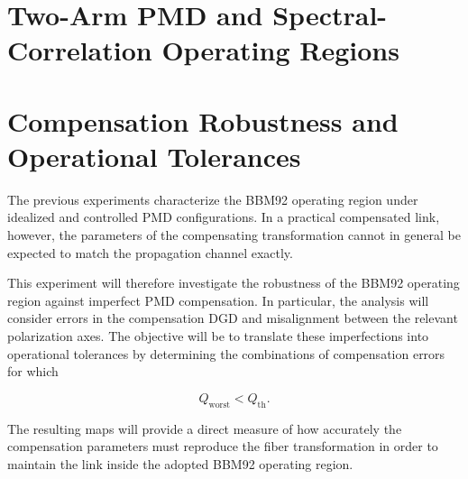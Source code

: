 
\section{Two-Arm PMD and Spectral-Correlation Operating Regions}
\label{sec:two_arm_pmd_spectral_operating_regions}



\section{Compensation Robustness and Operational Tolerances}
\label{sec:compensation_robustness_operational_tolerances}

The previous experiments characterize the BBM92 operating region under idealized
and controlled PMD configurations. In a practical compensated link, however, the
parameters of the compensating transformation cannot in general be expected to
match the propagation channel exactly.

This experiment will therefore investigate the robustness of the BBM92 operating
region against imperfect PMD compensation. In particular, the analysis will
consider errors in the compensation DGD and misalignment between the relevant
polarization axes. The objective will be to translate these imperfections into
operational tolerances by determining the combinations of compensation errors
for which

\begin{equation}
Q_{\mathrm{worst}}
<
Q_{\mathrm{th}}.
\end{equation}

The resulting maps will provide a direct measure of how accurately the
compensation parameters must reproduce the fiber transformation in order to
maintain the link inside the adopted BBM92 operating region.

% 



